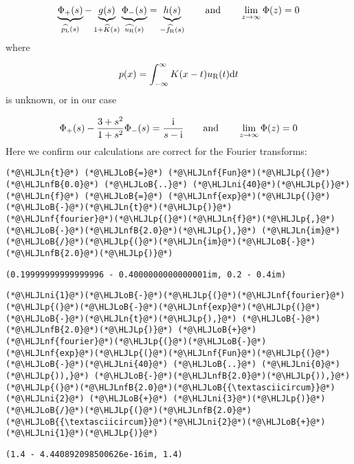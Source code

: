 \documentclass[12pt,a4paper]{article}
\newcommand{\HLJLn}[1]{#1}
\newcommand{\HLJLnf}[1]{\textcolor[RGB]{66,102,213}{#1}}
\newcommand{\HLJLnfB}[1]{\textcolor[RGB]{59,151,46}{#1}}
\newcommand{\HLJLni}[1]{\textcolor[RGB]{59,151,46}{#1}}
\newcommand{\HLJLoB}[1]{\textcolor[RGB]{102,102,102}{\textbf{#1}}}
\newcommand{\HLJLp}[1]{#1}
\def\qqand{\qquad\hbox{and}\qquad}
\def\D{ {\rm d} }
\def\I{ {\rm i} }
\def\fR{ f_{\rm R} }
\def\dt{\D t}
\begin{document}
\[
\underbrace{\Phi_+(s)}_{\widehat{p_{\rm L}}(s)} - \underbrace{g(s)}_{1 + \widehat K(s)}
\underbrace{\Phi_-(s)}_{\widehat{u_{\rm R}}(s)} = \underbrace{h(s)}_{-\widehat{\fR}(s)} \qqand \lim_{z \to \infty}\Phi(z) = 0
\]
where

\[
p(x) = \int_{-\infty}^\infty K(x-t)u_{\rm R}(t) \dt
\]
is unknown, or in our case

\[
\Phi_+(s) - {3 + s^2 \over 1 + s^2} \Phi_-(s) = {\I \over s - \I} \qqand \lim_{z \to \infty}\Phi(z) = 0
\]
Here we confirm our calculations are correct for the Fourier transforms:


\begin{lstlisting}
(*@\HLJLn{t}@*) (*@\HLJLoB{=}@*) (*@\HLJLnf{Fun}@*)(*@\HLJLp{(}@*)(*@\HLJLnfB{0.0}@*) (*@\HLJLoB{..}@*) (*@\HLJLni{40}@*)(*@\HLJLp{)}@*)
(*@\HLJLn{f}@*) (*@\HLJLoB{=}@*) (*@\HLJLnf{exp}@*)(*@\HLJLp{(}@*)(*@\HLJLoB{-}@*)(*@\HLJLn{t}@*)(*@\HLJLp{)}@*)
(*@\HLJLnf{fourier}@*)(*@\HLJLp{(}@*)(*@\HLJLn{f}@*)(*@\HLJLp{,}@*) (*@\HLJLoB{-}@*)(*@\HLJLnfB{2.0}@*)(*@\HLJLp{),}@*) (*@\HLJLn{im}@*)(*@\HLJLoB{/}@*)(*@\HLJLp{(}@*)(*@\HLJLn{im}@*)(*@\HLJLoB{-}@*)(*@\HLJLnfB{2.0}@*)(*@\HLJLp{)}@*)
\end{lstlisting}

\begin{lstlisting}
(0.19999999999999996 - 0.4000000000000001im, 0.2 - 0.4im)
\end{lstlisting}


\begin{lstlisting}
(*@\HLJLni{1}@*)(*@\HLJLoB{-}@*)(*@\HLJLp{(}@*)(*@\HLJLnf{fourier}@*)(*@\HLJLp{(}@*)(*@\HLJLoB{-}@*)(*@\HLJLnf{exp}@*)(*@\HLJLp{(}@*)(*@\HLJLoB{-}@*)(*@\HLJLn{t}@*)(*@\HLJLp{),}@*) (*@\HLJLoB{-}@*)(*@\HLJLnfB{2.0}@*)(*@\HLJLp{)}@*) (*@\HLJLoB{+}@*) (*@\HLJLnf{fourier}@*)(*@\HLJLp{(}@*)(*@\HLJLoB{-}@*)(*@\HLJLnf{exp}@*)(*@\HLJLp{(}@*)(*@\HLJLnf{Fun}@*)(*@\HLJLp{(}@*)(*@\HLJLoB{-}@*)(*@\HLJLni{40}@*) (*@\HLJLoB{..}@*) (*@\HLJLni{0}@*)(*@\HLJLp{)),}@*) (*@\HLJLoB{-}@*)(*@\HLJLnfB{2.0}@*)(*@\HLJLp{)),}@*) (*@\HLJLp{(}@*)(*@\HLJLnfB{2.0}@*)(*@\HLJLoB{{\textasciicircum}}@*)(*@\HLJLni{2}@*) (*@\HLJLoB{+}@*) (*@\HLJLni{3}@*)(*@\HLJLp{)}@*)(*@\HLJLoB{/}@*)(*@\HLJLp{(}@*)(*@\HLJLnfB{2.0}@*)(*@\HLJLoB{{\textasciicircum}}@*)(*@\HLJLni{2}@*)(*@\HLJLoB{+}@*)(*@\HLJLni{1}@*)(*@\HLJLp{)}@*)
\end{lstlisting}

\begin{lstlisting}
(1.4 - 4.440892098500626e-16im, 1.4)
\end{lstlisting}
\end{document}
